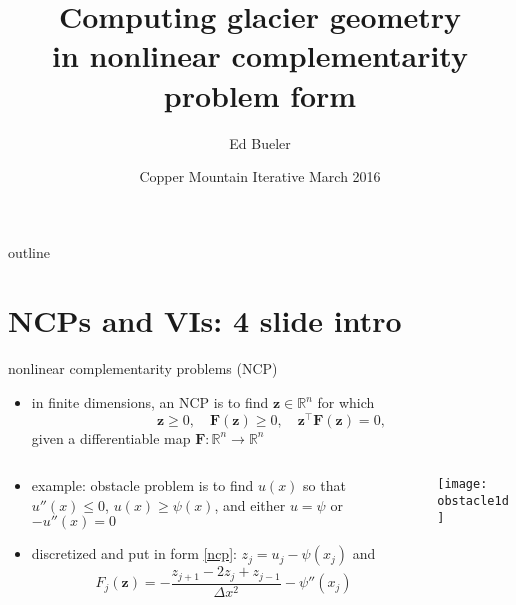 \documentclass{beamer}
\title[Computing glacier geometry]{Computing glacier geometry \\ in nonlinear complementarity problem form}
\author{Ed Bueler}
\institute[UAF] %
{
  Dept of Mathematics and Statistics, and Geophysical Institute\\
  University of Alaska Fairbanks \\
  \tiny (\emph{funded by NASA Modeling, Analysis, and Prediction program})%
}
\date[Copper Mtn 2016]{Copper Mountain Iterative March 2016}
\newcommand\bz{\mathbf{z}}
\newcommand\bF{\mathbf{F}}
\newcommand\RR{\mathbb{R}}
\begin{document}
\graphicspath{{../../talks-public/commonfigs/}}

\begin{frame}
  \titlepage
\end{frame}


\begin{frame}{outline}
  \tableofcontents
\end{frame}


\section{NCPs and VIs: 4 slide intro}

\begin{frame}{nonlinear complementarity problems (NCP)}

\begin{itemize}
\item in finite dimensions, an NCP is to find $\bz\in\RR^n$ for which
\begin{equation}
\bz \ge 0, \quad \bF(\bz) \ge 0, \quad \bz^\top \bF(\bz) = 0, \label{ncp}
\end{equation}
given a differentiable map $\bF:\RR^n \to \RR^n$
\end{itemize}

\begin{columns}
\begin{column}{0.5\textwidth}
\small
\begin{itemize}
\item \alert{example}: obstacle problem is to find $u(x)$ so that $u''(x) \le 0$, $u(x) \ge \psi(x)$, and either $u=\psi$ or $-u''(x) = 0$
\item discretized and put in form \eqref{ncp}: $z_j=u_j - \psi(x_j)$ and
  $$F_j(\bz) = - \frac{z_{j+1} - 2 z_j + z_{j-1}}{\Delta x^2} - \psi''(x_j)$$
\end{itemize}
\end{column}
\begin{column}{0.5\textwidth}
\texttt{[image: obstacle1d]}
\end{column}
\end{columns}
\end{frame}
\end{document}
